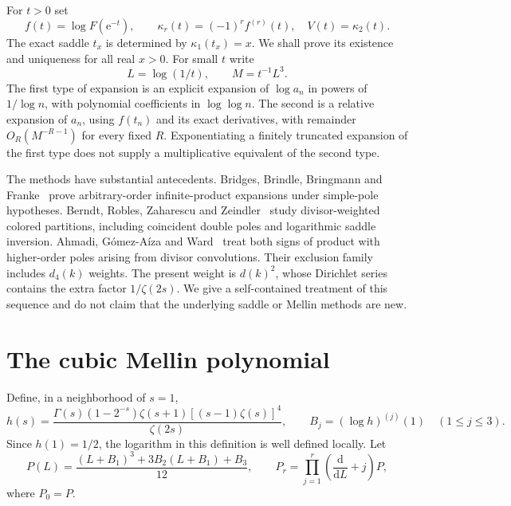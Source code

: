 \documentclass[11pt,letterpaper]{article}
\numberwithin{equation}{section}
\theoremstyle{remark}
\newcommand{\dd}{\mathrm d}
\newcommand{\e}{\mathrm e}
\begin{document}
For $t>0$ set
\begin{equation}\label{dwa:sq:eq:data}
 f(t)=\log F(\e^{-t}),\qquad
 \kappa_r(t)=(-1)^rf^{(r)}(t),\quad V(t)=\kappa_2(t).
\end{equation}
The exact saddle $t_x$ is determined by $\kappa_1(t_x)=x$. We shall prove its existence and uniqueness for all real $x>0$. For small $t$ write
\[
 L=\log(1/t),\qquad M=t^{-1}L^3.
\]
The first type of expansion is an explicit expansion of $\log a_n$ in powers of $1/\log n$, with polynomial coefficients in $\log\log n$. The second is a relative expansion of $a_n$, using $f(t_n)$ and its exact derivatives, with remainder $O_R(M^{-R-1})$ for every fixed $R$. Exponentiating a finitely truncated expansion of the first type does not supply a multiplicative equivalent of the second type.

The methods have substantial antecedents. Bridges, Brindle, Bringmann and Franke~\cite{BBBF} prove arbitrary-order infinite-product expansions under simple-pole hypotheses. Berndt, Robles, Zaharescu and Zeindler~\cite{BRZZ} study divisor-weighted colored partitions, including coincident double poles and logarithmic saddle inversion. Ahmadi, G\'omez-A\'iza and Ward~\cite{AGW} treat both signs of product with higher-order poles arising from divisor convolutions. Their exclusion family includes $d_4(k)$ weights. The present weight is $d(k)^2$, whose Dirichlet series contains the extra factor $1/\zeta(2s)$. We give a self-contained treatment of this sequence and do not claim that the underlying saddle or Mellin methods are new.

\section{The cubic Mellin polynomial}
Define, in a neighborhood of $s=1$,
\begin{equation}\label{dwa:sq:eq:h}
 h(s)=\frac{\Gamma(s)(1-2^{-s})\zeta(s+1)[(s-1)\zeta(s)]^4}{\zeta(2s)},
 \qquad B_j=(\log h)^{(j)}(1)\quad(1\le j\le3).
\end{equation}
Since $h(1)=1/2$, the logarithm in this definition is well defined locally. Let
\begin{equation}\label{dwa:sq:eq:P}
 P(L)=\frac{(L+B_1)^3+3B_2(L+B_1)+B_3}{12},\qquad
 P_r=\prod_{j=1}^r\left(\frac{\dd}{\dd L}+j\right)P,
\end{equation}
where $P_0=P$.
\end{document}
